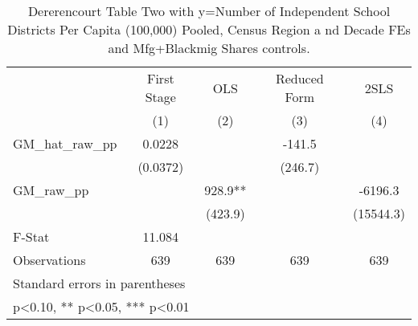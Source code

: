 \begin{table}[htbp]\centering
\def\sym#1{\ifmmode^{#1}\else\(^{#1}\)\fi}
\caption{Dererencourt Table Two with y=Number of Independent School Districts Per Capita (100,000) Pooled, Census Region a nd Decade FEs and Mfg+Blackmig Shares controls.}
\begin{tabular}{l*{4}{c}}
\toprule
                    & First Stage   &         OLS   &Reduced Form   &        2SLS   \\
                    &\multicolumn{1}{c}{(1)}   &\multicolumn{1}{c}{(2)}   &\multicolumn{1}{c}{(3)}   &\multicolumn{1}{c}{(4)}   \\
\midrule
GM\_hat\_raw\_pp       &      0.0228   &               &      -141.5   &               \\
                    &    (0.0372)   &               &     (246.7)   &               \\
\addlinespace
GM\_raw\_pp           &               &       928.9** &               &     -6196.3   \\
                    &               &     (423.9)   &               &   (15544.3)   \\
\midrule
F-Stat              &      11.084   &               &               &               \\
Observations        &         639   &         639   &         639   &         639   \\
\bottomrule
\multicolumn{5}{l}{\footnotesize Standard errors in parentheses}\\
\multicolumn{5}{l}{\footnotesize * p<0.10, ** p<0.05, *** p<0.01}\\
\end{tabular}
\end{table}
